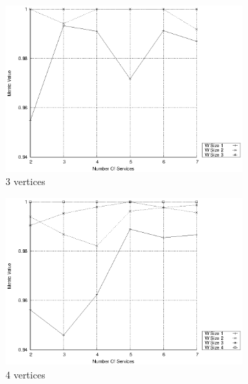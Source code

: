 \begin{figure}[!htb]
  \centering
  \begin{subfigure}{0.33\textwidth}
    \includegraphics[width=\textwidth]{Images/graphs/window_quality_performance_diff_qual_n7_s7_20_100_n3}
    \caption{3 vertices}
    \label{fig:quality_window_wide_qualitative_n3}
  \end{subfigure}
  \hfill
  \begin{subfigure}{0.33\textwidth}
    \includegraphics[width=\textwidth]{Images/graphs/window_quality_performance_diff_qual_n7_s7_20_100_n4}
    \caption{4 vertices}
    \label{fig:quality_window_wide_qualitative_n4}
  \end{subfigure}
  \hfill
  \begin{subfigure}{0.33\textwidth}

\end{subfigure}
\end{figure}
